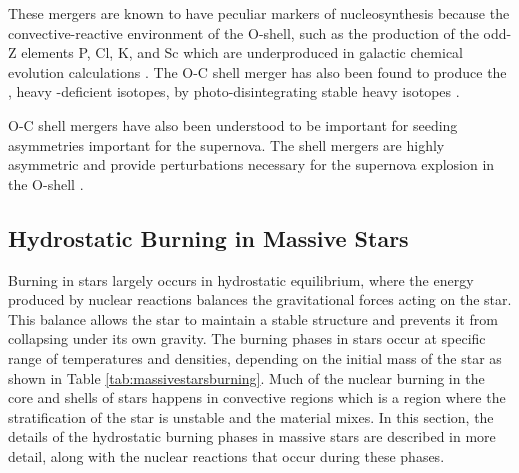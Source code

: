 These mergers are known to have peculiar markers of nucleosynthesis because the convective-reactive environment of the O-shell, such as the production of the odd-Z elements P, Cl, K, and Sc which are underproduced in galactic chemical evolution calculations \citep{ritterConvectivereactiveNucleosynthesisSc2018,robertiOccurrenceImpactCarbonOxygen2025}.
The O-C shell merger has also been found to produce the \pnucn{}, heavy \nt-deficient isotopes, by photo-disintegrating stable heavy isotopes \citep{rauscherNucleosynthesisMassiveStars2002, ritterConvectivereactiveNucleosynthesisSc2018, robertiGprocessNucleosynthesisCorecollapse2023}.

O-C shell mergers have also been understood to be important for seeding asymmetries important for the supernova.
The shell mergers are highly asymmetric and provide perturbations necessary for the supernova explosion in the O-shell \citep{mullerStatusMultiDimensionalCoreCollapse2016, collinsPropertiesConvectiveOxygen2018, mullerHydrodynamicsCorecollapseSupernovae2020, yadavLargescaleMixingViolent2020a, andrassy3DHydrodynamicSimulations2020}.

\subsection{Hydrostatic Burning in Massive Stars}

Burning in stars largely occurs in hydrostatic equilibrium, where the energy produced by nuclear reactions balances the gravitational forces acting on the star.
This balance allows the star to maintain a stable structure and prevents it from collapsing under its own gravity.
The burning phases in stars occur at specific range of temperatures and densities, depending on the initial mass of the star as shown in Table \ref{tab:massivestarsburning}.
Much of the nuclear burning in the core and shells of stars happens in convective regions which is a region where the stratification of the star is unstable and the material mixes.  
In this section, the details of the hydrostatic burning phases in massive stars are described in more detail, along with the nuclear reactions that occur during these phases.

